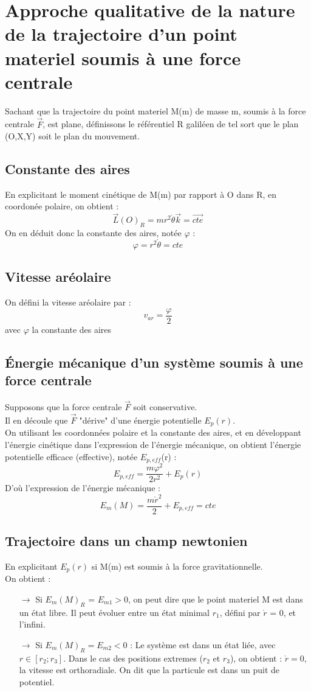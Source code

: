 \section{Approche qualitative de la nature de la trajectoire d'un point materiel soumis à une force centrale}
Sachant que la trajectoire du point materiel M(m) de masse m, soumis à la force centrale $\overrightarrow{F}$, est plane, définissons le référentiel R galiléen de tel sort que le plan (O,X,Y) soit le plan du mouvement.
\subsection{Constante des aires}
En explicitant le moment cinétique de M(m) par rapport à O dans R, en coordonée polaire, on obtient :
$$\overrightarrow{L}(O)_R = mr^2\mathring{\theta}\overrightarrow{k} = \overrightarrow{cte}$$
On en déduit donc la constante des aires, notée $\varphi$ : 
$$\varphi = r^2\mathring{\theta} = cte$$
\subsection{Vitesse aréolaire}
\begin{de}
On défini la vitesse aréolaire par : 
$$v_{ar} = \dfrac{\varphi}{2}$$
avec $\varphi$ la constante des aires
\end{de}
\subsection{Énergie mécanique d'un système soumis à une force centrale}
Supposons que la force centrale $\overrightarrow{F}$ soit conservative.\\
Il en découle que $\overrightarrow{F}$ "dérive" d'une énergie potentielle $E_p(r)$.\\
On utilisant les coordonnées polaire et la constante des aires, et en développant l'énergie cinétique dans l'expression de l'énergie mécanique, on obtient l'énergie potentielle efficace (effective), notée $E_{p,eff}$(r) :
$$E_{p,eff} = \dfrac{m\varphi^2}{2r^2} + E_p(r)$$
D'où l'expression de l'énergie mécanique :
$$E_m(M) = \dfrac{m\mathring{r}^2}{2} + E_{p,eff} = cte$$ 
\subsection{Trajectoire dans un champ newtonien}
En explicitant $E_p(r)$ si M(m) est soumis à la force gravitationnelle.\\
On obtient :
\begin{itemize}
 \item[$\rightarrow$] Si $E_m(M)_R$ = $E_{m1} > 0$, on peut dire que le point materiel M est dans un état libre. Il peut évoluer entre un état minimal $r_1$, défini par $\mathring{r}$ = 0, et l'infini.
 \item[$\rightarrow$] Si $E_m(M)_R = E_{m2} < 0$ : Le système est dans un état liée, avec $r \in [r_2;r_3]$. Dans le cas des positions extremes ($r_2$ et $r_3$), on obtient : $\mathring{r} = 0$, la vitesse est orthoradiale. On dit que la particule est dans un puit de potentiel.
\end{itemize}
